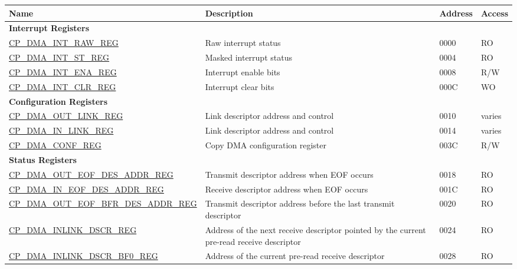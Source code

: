 \begin{longtable}{ | p{6cm} | p{7.2cm} | p{1.3cm} | p{1cm} | }
\hline\rowcolor{lightgray}
Name & Description &  Address & Access \\ \hline
\endhead
\multicolumn{4}{|l|}{\textbf{Interrupt Registers}} \\ \hline
\hyperref[regdesc:CPDMAINTRAWREG]{CP\_DMA\_INT\_RAW\_REG} & Raw interrupt status & \hexprefix{}0000 & RO \\ \hline
\hyperref[regdesc:CPDMAINTSTREG]{CP\_DMA\_INT\_ST\_REG} & Masked interrupt status & \hexprefix{}0004 & RO \\ \hline
\hyperref[regdesc:CPDMAINTENAREG]{CP\_DMA\_INT\_ENA\_REG} & Interrupt enable bits & \hexprefix{}0008 & R/W \\ \hline
\hyperref[regdesc:CPDMAINTCLRREG]{CP\_DMA\_INT\_CLR\_REG} & Interrupt clear bits & \hexprefix{}000C & WO \\ \hline
\multicolumn{4}{|l|}{\textbf{Configuration Registers}} \\ \hline
\hyperref[regdesc:CPDMAOUTLINKREG]{CP\_DMA\_OUT\_LINK\_REG} & Link descriptor address and control & \hexprefix{}0010 & varies \\ \hline
\hyperref[regdesc:CPDMAINLINKREG]{CP\_DMA\_IN\_LINK\_REG} & Link descriptor address and control & \hexprefix{}0014 & varies \\ \hline
\hyperref[regdesc:CPDMACONFREG]{CP\_DMA\_CONF\_REG} & Copy DMA configuration register & \hexprefix{}003C & R/W \\ \hline
\multicolumn{4}{|l|}{\textbf{Status Registers}} \\ \hline
\hyperref[regdesc:CPDMAOUTEOFDESADDRREG]{CP\_DMA\_OUT\_EOF\_DES\_ADDR\_REG} & Transmit descriptor address when EOF occurs & \hexprefix{}0018 & RO \\ \hline
\hyperref[regdesc:CPDMAINEOFDESADDRREG]{CP\_DMA\_IN\_EOF\_DES\_ADDR\_REG} & Receive descriptor address when EOF occurs & \hexprefix{}001C & RO \\ \hline
\hyperref[regdesc:CPDMAOUTEOFBFRDESADDRREG]{CP\_DMA\_OUT\_EOF\_BFR\_DES\_ADDR\newline\_REG} & Transmit descriptor address before the last transmit descriptor & \hexprefix{}0020 & RO \\ \hline
\hyperref[regdesc:CPDMAINLINKDSCRREG]{CP\_DMA\_INLINK\_DSCR\_REG} & Address of the next receive descriptor pointed by the current pre-read receive descriptor & \hexprefix{}0024 & RO \\ \hline
\hyperref[regdesc:CPDMAINLINKDSCRBF0REG]{CP\_DMA\_INLINK\_DSCR\_BF0\_REG} & Address of the current pre-read receive descriptor & \hexprefix{}0028 & RO \\ \hline

\end{longtable}
